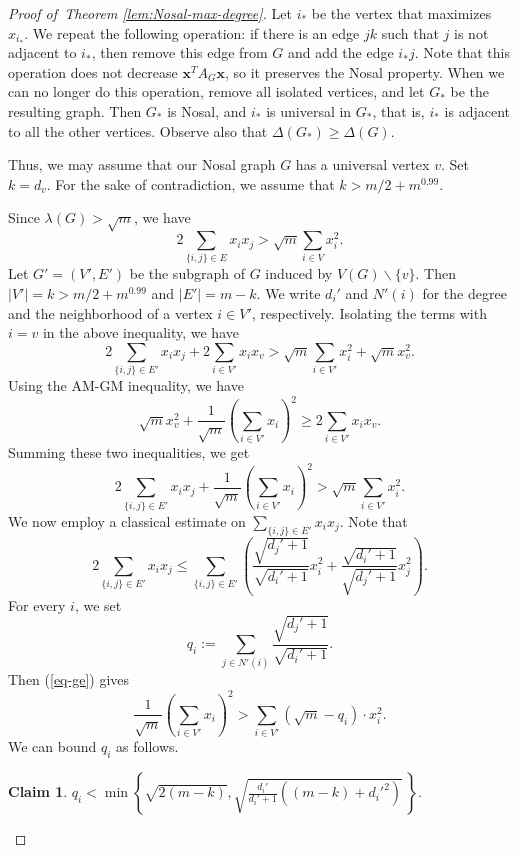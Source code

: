 \documentclass[11pt,a4paper]{article}
\newtheorem{claim}[theorem]{Claim}
\theoremstyle{definition}
\theoremstyle{remark}
\begin{document}
\begin{proof}[Proof of~Theorem \ref{lem:Nosal-max-degree}]
Let $i_*$ be the vertex that maximizes $x_{i_*}$. We repeat the following operation: if there is an edge $jk$ such that $j$ is not adjacent to $i_*$, then remove this edge from $G$ and add the edge $i_* j$. Note that this operation does not decrease $\bm{x}^T A_G \bm{x}$, so it preserves the Nosal property. When we can no longer do this operation, remove all isolated vertices, and let $G_*$ be the resulting graph. Then $G_*$ is Nosal, and $i_*$ is universal in $G_*$, that is, $i_*$ is adjacent to all the other vertices. Observe also that $\Delta(G_*) \geq \Delta(G)$. 

Thus, we may assume that our Nosal graph $G$ has a universal vertex $v$. Set $k = d_v$. For the sake of contradiction, 
we assume that $k > m/2 + m^{0.99}$.

Since $\lambda(G) > \sqrt{m}$, we have
$$ 2\sum_{\{i,j\} \in E} x_i x_j > \sqrt{m} 
\sum_{i \in V} x_i^2.$$
Let $G' = (V', E')$ be the subgraph of $G$ induced by 
$V(G) \backslash \{v\}$. 
Then $|V'|=k > m/2 +m^{0.99}$ and 
$|E'|=m-k$. 
We write $d_i'$ and $N'(i)$ for the degree and the neighborhood of a vertex $i\in V'$, respectively. 
Isolating the terms with $i = v$ in the above inequality, we have
$$2 \sum_{\{i,j\} \in E'} x_i x_j + 
2 \sum_{i \in V'} x_i x_v
> \sqrt{m} \sum_{i \in V'} x_i^2 + \sqrt{m} x_v^2.$$
Using the AM-GM inequality, we have
$$\sqrt{m} x_v^2 + \frac{1}{\sqrt{m}} 
\left( \sum_{i\in V'} x_i \right)^2 
\ge 2\sum_{i\in V'} x_i x_v.$$
Summing these two inequalities, we get 
\begin{equation} \label{eq-ge}
 2\sum_{\{i,j\} \in E'} x_i x_j + 
\frac{1}{\sqrt{m}} \left(\sum_{i \in V'} x_i \right)^2 
> \sqrt{m} \sum_{i \in V'} x_i^2. 
\end{equation} 
We now employ a classical estimate on 
$\sum_{\{i,j\} \in E'} x_i x_j$. Note that
$$ 2 \sum_{\{i,j\} \in E'} x_i x_j 
\leq \sum_{\{i,j\} \in E'} 
\left( \frac{\sqrt{d_j' + 1}}{\sqrt{d_i' + 1}} x_i^2 + \frac{\sqrt{d_i' + 1}}{\sqrt{d_j' + 1}} x_j^2\right).$$
For every $i$, we set
$$q_i := \sum_{j\in N'(i)} \frac{\sqrt{d_j' + 1}}{\sqrt{d_i' + 1}}.$$  
Then (\ref{eq-ge}) gives 
\begin{equation} \label{eq-recall}
\frac{1}{\sqrt{m}} \left(\sum_{i \in V'} x_i\right)^2 > 
\sum_{i \in V'} (\sqrt{m} - q_i ) \cdot x_i^2.
\end{equation}
We can bound $q_i$ as follows.

\begin{claim}\label{cl:1}
$q_i < \min\left\{ 
\sqrt{2(m - k)}, \sqrt{ \frac{d_i'}{d_i' + 1} \left((m - k) + d_i'^2\right)} \, \right\}.$   
\end{claim}



\end{proof}
\end{document}

